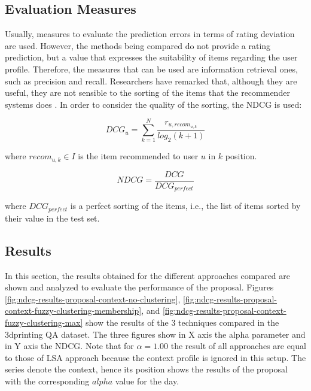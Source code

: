 \documentclass[preprint]{elsarticle}
\begin{document}
\begin{spacing}{1.5}
\subsection{Evaluation Measures}

Usually, measures to evaluate the prediction errors in terms of rating deviation are used. However, the methods being compared do not provide a rating prediction, but a value that expresses the suitability of items regarding the user profile. Therefore, the measures that can be used are information retrieval ones, such as precision and recall. Researchers have remarked that, although they are useful, they are not sensible to the sorting of the items that the recommender systems does \cite{Gunawardana2015}. In order to consider the quality of the sorting, the NDCG is used:

\begin{equation}
	DCG_u = \sum_{k=1}^N\frac{r_{u,recom_{u,k}}}{log_2 (k+1)}
\end{equation}

\noindent where $recom_{u,k} \in I$ is the item recommended to user $u$ in $k$ position.

\begin{equation}
	NDCG = \frac{DCG}{DCG_{perfect}}
\end{equation}

\noindent where $DCG_{perfect}$ is a perfect sorting of the items, i.e., the list of items sorted by their value in the test set.

\subsection{Results}

In this section, the results obtained for the different approaches compared are shown and analyzed to evaluate the performance of the proposal. Figures \ref{fig:ndcg-results-proposal-context-no-clustering}, \ref{fig:ndcg-results-proposal-context-fuzzy-clustering-membership}, and \ref{fig:ndcg-results-proposal-context-fuzzy-clustering-max} show the results of the 3 techniques compared in the 3dprinting QA dataset. The three figures show in X axis the alpha parameter and in Y axis the NDCG. Note that for $\alpha=1.00$ the result of all approaches are equal to those of LSA approach because the context profile is ignored in this setup. The series denote the context, hence its position shows the results of the proposal with the corresponding $alpha$ value for the day.


\end{spacing}
\end{document}
